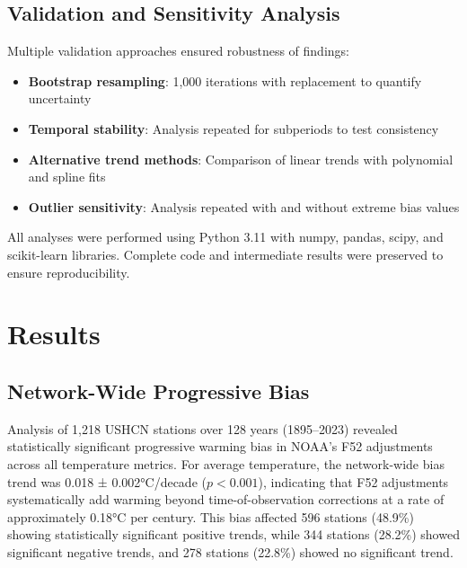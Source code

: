 \documentclass[11pt, a4paper]{article}
\begin{document}
\subsection{Validation and Sensitivity Analysis}

Multiple validation approaches ensured robustness of findings:

\begin{itemize}
    \item \textbf{Bootstrap resampling}: 1,000 iterations with replacement to quantify uncertainty
    \item \textbf{Temporal stability}: Analysis repeated for subperiods to test consistency
    \item \textbf{Alternative trend methods}: Comparison of linear trends with polynomial and spline fits
    \item \textbf{Outlier sensitivity}: Analysis repeated with and without extreme bias values
\end{itemize}

All analyses were performed using Python 3.11 with numpy, pandas, scipy, and scikit-learn libraries. Complete code and intermediate results were preserved to ensure reproducibility.

\section{Results}
\subsection{Network-Wide Progressive Bias}

Analysis of 1,218 USHCN stations over 128 years (1895–2023) revealed statistically significant progressive warming bias in NOAA's F52 adjustments across all temperature metrics. For average temperature, the network-wide bias trend was 0.018 ± 0.002°C/decade ($p < 0.001$), indicating that F52 adjustments systematically add warming beyond time-of-observation corrections at a rate of approximately 0.18°C per century. This bias affected 596 stations (48.9\%) showing statistically significant positive trends, while 344 stations (28.2\%) showed significant negative trends, and 278 stations (22.8\%) showed no significant trend.
\end{document}
